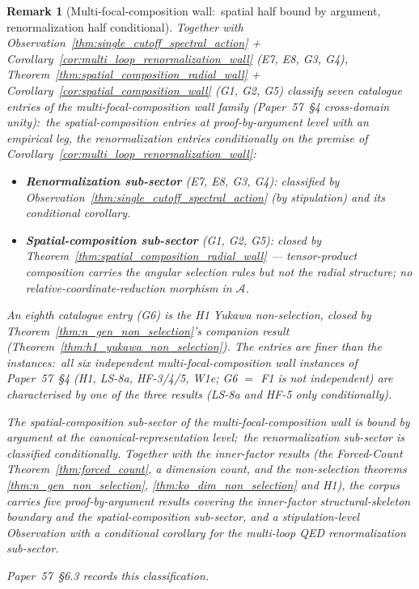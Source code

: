 \documentclass[11pt]{article}
\newtheorem{remark}{Remark}
\begin{document}
\begin{remark}[Multi-focal-composition wall:\ spatial half bound by argument, renormalization half conditional]
\label{rem:multi_focal_wall_fully_characterized}
Together with
Observation~\ref{thm:single_cutoff_spectral_action} +
Corollary~\ref{cor:multi_loop_renormalization_wall} (E7, E8, G3, G4),
Theorem~\ref{thm:spatial_composition_radial_wall} +
Corollary~\ref{cor:spatial_composition_wall} (G1, G2, G5) classify seven
catalogue entries of the multi-focal-composition wall family
(Paper~57~\S 4 cross-domain unity):\ the spatial-composition entries at
proof-by-argument level with an empirical leg, the renormalization
entries conditionally on the premise of
Corollary~\ref{cor:multi_loop_renormalization_wall}:

\begin{itemize}\setlength{\itemsep}{1pt}
\item \textbf{Renormalization sub-sector} (E7, E8, G3, G4): classified by
  Observation~\ref{thm:single_cutoff_spectral_action} (by stipulation)
  and its conditional corollary.
\item \textbf{Spatial-composition sub-sector} (G1, G2, G5): closed by
  Theorem~\ref{thm:spatial_composition_radial_wall} — tensor-product
  composition carries the angular selection rules but not the radial
  structure;
  no relative-coordinate-reduction morphism in $\mathcal{A}$.
\end{itemize}

An eighth catalogue entry (G6) is the H1 Yukawa non-selection, closed
by Theorem~\ref{thm:n_gen_non_selection}'s companion result
(Theorem~\ref{thm:h1_yukawa_non_selection}).  The entries are finer than the instances:\ all
six independent multi-focal-composition wall instances of
Paper~57~\S 4 (H1, LS-8a, HF-3/4/5, W1e; G6 $=$ F1 is not independent)
are characterised by one of the three results (LS-8a and HF-5 only conditionally).

The spatial-composition sub-sector of the multi-focal-composition wall
is bound by argument at the canonical-representation level;\ the
renormalization sub-sector is classified conditionally.  Together with the inner-factor
results (the Forced-Count Theorem~\ref{thm:forced_count}, a dimension
count, and the non-selection theorems \ref{thm:n_gen_non_selection},
\ref{thm:ko_dim_non_selection} and H1), the corpus carries five
proof-by-argument results covering the inner-factor structural-skeleton
boundary and the spatial-composition sub-sector, and a
stipulation-level Observation with a conditional corollary for the
multi-loop QED renormalization sub-sector.

Paper~57~\S 6.3 records this classification.
\end{remark}
\end{document}
